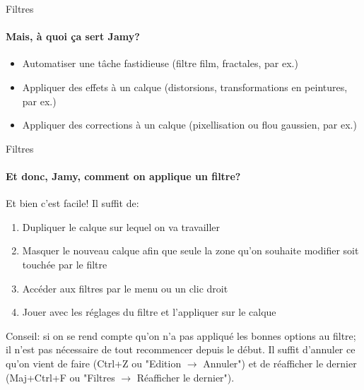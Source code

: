 \documentclass[10pt,svgnames,usenames,table]{beamer}
\begin{document}
	\begin{frame}{Filtres}
		\framesubtitle{Mais, à quoi ça sert Jamy?}
			\begin{itemize}
			\item Automatiser une tâche fastidieuse (filtre film, fractales, par ex.)
			\item Appliquer des effets à un calque (distorsions, transformations en peintures, par ex.)
			\item Appliquer des corrections à un calque (pixellisation ou flou gaussien, par ex.)
			\end{itemize}				
	\end{frame}		

	\begin{frame}{Filtres}
		\framesubtitle{Et donc, Jamy, comment on applique un filtre?}		
		Et bien c'est facile! Il suffit de: 
		\begin{enumerate}
			\item Dupliquer le calque sur lequel on va travailler
			\item Masquer le nouveau calque afin que seule la zone qu'on souhaite modifier soit touchée par le filtre
			\item Accéder aux filtres par le menu ou un clic droit
			\item Jouer avec les réglages du filtre et l'appliquer sur le calque
		\end{enumerate}

		Conseil: si on se rend compte qu'on n'a pas appliqué les bonnes options au filtre; il n'est pas nécessaire de tout recommencer depuis le début. Il suffit d'annuler ce qu'on vient de faire (Ctrl+Z ou "Edition $\rightarrow$ Annuler") et de réafficher le dernier (Maj+Ctrl+F ou "Filtres $\rightarrow$ Réafficher le dernier").		
		
	\end{frame}
\end{document}
